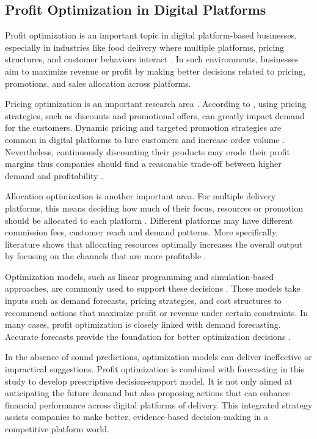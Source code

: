 \subsection{Profit Optimization in Digital Platforms}

Profit optimization is an important topic in digital platform-based businesses, especially in industries like food delivery where multiple platforms, pricing structures, and customer behaviors interact \citep{deng2022profit}. In such environments, businesses aim to maximize revenue or profit by making better decisions related to pricing, promotions, and sales allocation across platforms.

Pricing optimization is an important research area \citep{rangaswamy2020role}. According to \cite{ali2024investigating}, using pricing strategies, such as discounts and promotional offers, can greatly impact demand for the customers. Dynamic pricing and targeted promotion strategies are common in digital platforms to lure customers and increase order volume \citep{kopalle2023dynamic}. Nevertheless, continuously discounting their products may erode their profit margins thus companies should find a reasonable trade-off between higher demand and profitability \citep{nowak2024dynamic}.

Allocation optimization is another important area. For multiple delivery platforms, this means deciding how much of their focus, resources or promotion should be allocated to each platform \citep{ashraf2023optimal}. Different platforms may have different commission fees, customer reach and demand patterns. More specifically, literature shows that allocating resources optimally increases the overall output by focusing on the channels that are more profitable \citep{alnaggar2021crowdsourced}.

Optimization models, such as linear programming and simulation-based approaches, are commonly used to support these decisions \citep{abolghasemian2025simulation}. These models take inputs such as demand forecasts, pricing strategies, and cost structures to recommend actions that maximize profit or revenue under certain constraints. In many cases, profit optimization is closely linked with demand forecasting. Accurate forecasts provide the foundation for better optimization decisions \citep{verma2024transforming}.

In the absence of sound predictions, optimization models can deliver ineffective or impractical suggestions. Profit optimization is combined with forecasting in this study to develop prescriptive decision-support model. It is not only aimed at anticipating the future demand but also proposing actions that can enhance financial performance across digital platforms of delivery. This integrated strategy assists companies to make better, evidence-based decision-making in a competitive platform world.


